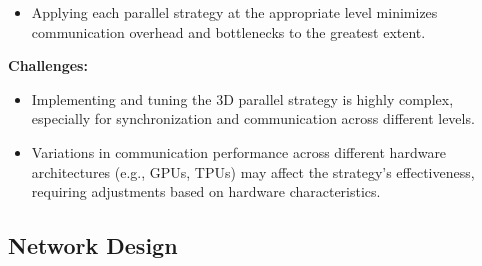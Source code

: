 \documentclass{article}
\begin{document}
    \begin{itemize}
        
            \item Applying each parallel strategy at the appropriate level minimizes communication overhead and bottlenecks to the greatest extent.
        \end{itemize}

\textbf{Challenges:} 
    \begin{itemize}
            \item Implementing and tuning the 3D parallel strategy is highly complex, especially for synchronization and communication across different levels.
        \end{itemize}
    
    \begin{itemize}
        
            \item Variations in communication performance across different hardware architectures (e.g., GPUs, TPUs) may affect the strategy's effectiveness, requiring adjustments based on hardware characteristics.
        \end{itemize}



\subsection{Network Design}
\end{document}
